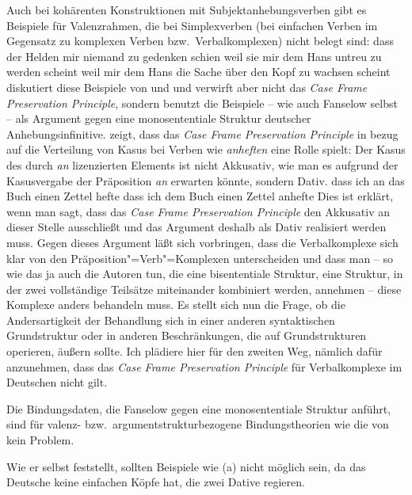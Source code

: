 {        Auch bei kohärenten Konstruktionen mit Subjektanhebungsverben gibt es Beispiele für Valenzrahmen,
        die bei Simplexverben (\dash bei einfachen Verben im Gegensatz zu komplexen Verben
        bzw.\ Verbalkomplexen) nicht belegt sind:
        \eal
        \ex dass der Helden mir niemand zu gedenken schien
        \ex weil sie mir dem Hans untreu zu werden scheint
        \ex weil mir dem Hans die Sache über den Kopf zu wachsen scheint
        \zl
        \citet[]{Grewendorf94a} diskutiert diese Beispiele von \citet[]{Olsen81a}
        und \citet{Fanselow89b} und verwirft aber nicht das \emph{Case Frame Preservation Principle},
        sondern benutzt die Beispiele -- wie auch Fanselow selbst -- als Argument gegen eine monosententiale Struktur
        deutscher Anhebungsinfinitive. \citet[]{Fanselow89b} zeigt, dass
        das \emph{Case Frame Preservation Principle} in bezug auf die Verteilung von Kasus
        bei Verben wie \emph{anheften} eine Rolle spielt: Der Kasus
        des durch \emph{an} lizenzierten Elements ist nicht Akkusativ, wie man es aufgrund
        der Kasusvergabe der Präposition \emph{an} erwarten könnte, sondern Dativ.
        \eal
        \ex dass ich an das Buch einen Zettel hefte
        \ex dass ich dem Buch einen Zettel anhefte
        \zl
        Dies ist erklärt, wenn man sagt, dass das \emph{Case Frame Preservation Principle}
        den Akkusativ an dieser Stelle ausschließt und das Argument deshalb als Dativ
        realisiert werden muss. Gegen dieses Argument läßt sich vorbringen, dass die Verbalkomplexe
        sich klar von den Präposition"=Verb"=Komplexen unterscheiden und dass man -- so wie
        das ja auch die Autoren tun, die eine bisententiale Struktur, \dash eine Struktur, in der zwei
        vollständige Teilsätze miteinander kombiniert werden, annehmen -- diese
        Komplexe anders behandeln muss. Es stellt sich nun die Frage, ob die Andersartigkeit 
        der Behandlung sich in einer anderen syntaktischen Grundstruktur oder in anderen
        Beschränkungen, die auf Grundstrukturen operieren, äußern sollte. Ich plädiere
        hier für den zweiten Weg, nämlich dafür anzunehmen, dass das \emph{Case Frame Preservation Principle}
        für Verbalkomplexe im Deutschen nicht gilt.

        Die Bindungsdaten, die Fanselow gegen eine monosententiale Struktur anführt,
        sind für valenz- bzw.\ argumentstrukturbezogene Bindungstheorien wie die von 
        kein Problem.
}
Wie er selbst feststellt, sollten Beispiele wie (a) nicht möglich sein,
da das Deutsche keine einfachen Köpfe hat, die zwei Dative regieren.

